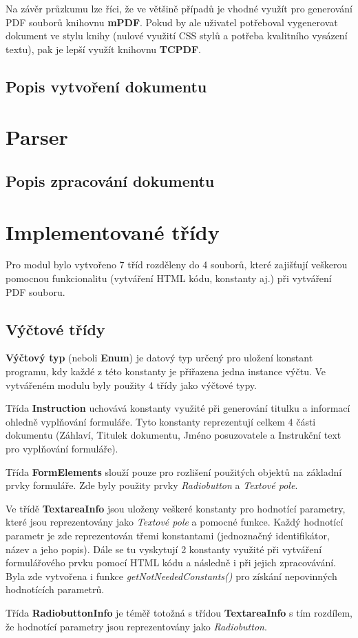 \par
Na závěr průzkumu lze říci, že ve většině případů je vhodné využít pro generování PDF souborů knihovnu \textbf{mPDF}. Pokud by ale uživatel potřeboval vygenerovat dokument ve stylu knihy (nulové využití CSS stylů a potřeba kvalitního vysázení textu), pak je lepší využít knihovnu \textbf{TCPDF}. 
\subsection{Popis vytvoření dokumentu}
\section{Parser}
\subsection{Popis zpracování dokumentu}
\section{Implementované třídy}
Pro modul bylo vytvořeno 7 tříd rozděleny do 4 souborů, které zajišťují veškerou pomocnou funkcionalitu (vytváření HTML kódu, konstanty aj.) při vytváření PDF souboru. 
\subsection{Výčtové třídy}
\textbf{Výčtový typ} (neboli \textbf{Enum}) je datový typ určený pro uložení konstant programu, kdy každé z této konstanty je přiřazena jedna instance výčtu. Ve vytvářeném modulu byly použity 4 třídy jako výčtové typy. 
\par
Třída \textbf{Instruction} uchovává konstanty využité při generování titulku a informací ohledně vyplňování formuláře. Tyto konstanty reprezentují celkem 4 části dokumentu (Záhlaví, Titulek dokumentu, Jméno posuzovatele a Instrukční text pro vyplňování formuláře).
\par
Třída \textbf{FormElements} slouží pouze pro rozlišení použitých objektů na základní prvky formuláře. Zde byly použity prvky \textit{Radiobutton} a \textit{Textové pole}.
\par
Ve třídě \textbf{TextareaInfo} jsou uloženy veškeré konstanty pro hodnotící parametry, které jsou reprezentovány jako \textit{Textové pole} a pomocné funkce. Každý hodnotící parametr je zde reprezentován třemi konstantami (jednoznačný identifikátor, název a jeho popis). Dále se tu vyskytují 2 konstanty využité při vytváření formulářového prvku pomocí HTML kódu a následně i při jejich zpracovávání. Byla zde vytvořena i funkce \textit{getNotNeededConstants()} pro získání nepovinných hodnotících parametrů.
\par
Třída \textbf{RadiobuttonInfo} je téměř totožná s třídou \textbf{TextareaInfo} s tím rozdílem, že hodnotící parametry jsou reprezentovány jako \textit{Radiobutton}.
